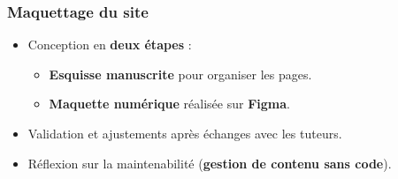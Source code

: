 \begin{frame}
    \frametitle{Maquettage du site}

    \begin{itemize}
        \item Conception en \textbf{deux étapes} :
              \begin{itemize}
                \item \textbf{Esquisse manuscrite} pour organiser les pages.
                \item \textbf{Maquette numérique} réalisée sur \textbf{Figma}.
              \end{itemize}
        \item Validation et ajustements après échanges avec les tuteurs.
        \item Réflexion sur la maintenabilité (\textbf{gestion de contenu sans code}).
    \end{itemize}
\end{frame}

